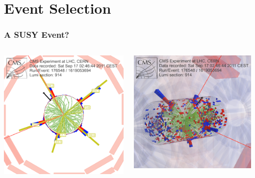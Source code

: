 \documentclass{beamer}
\begin{document}
\section{Event Selection}
\begin{frame}
  \frametitle{A SUSY Event?}
  \begin{columns}
    \begin{column}{0.5\textwidth}
      \centering
      \includegraphics[width=\textwidth]{figures/EvtDisplay_176548_914_1619053694_HT2577_MHT212_RhoPhi.png}
    \end{column}
    \begin{column}{0.5\textwidth}
      \centering
      \includegraphics[width=\textwidth]{figures/EvtDisplay_176548_914_1619053694_HT2577_MHT212_3D.png}

\end{column}
\end{columns}
\end{frame}
\end{document}
